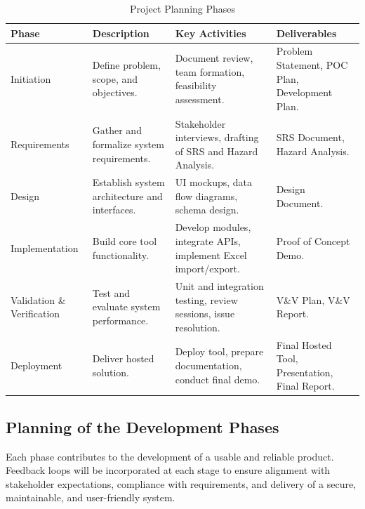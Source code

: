 \documentclass[12pt]{article}
\begin{document}
\begin{table}[H]
\centering
\caption{Project Planning Phases}
\setlength{\tabcolsep}{4pt}
\renewcommand{\arraystretch}{1.2}
\footnotesize

\begin{tabularx}{\textwidth}{p{2.5cm} Y Y Y}
\toprule
\textbf{Phase} & \textbf{Description} & \textbf{Key Activities} & \textbf{Deliverables} \\
\midrule
{}
Initiation &
Define problem, scope, and objectives. &
Document review, team formation, feasibility assessment. &
Problem Statement, POC Plan, Development Plan. \\
\hline
Requirements &
Gather and formalize system requirements. &
Stakeholder interviews, drafting of SRS and Hazard Analysis. &
SRS Document, Hazard Analysis. \\
\hline
Design &
Establish system architecture and interfaces. &
UI mockups, data flow diagrams, schema design. &
Design Document. \\
\hline
Implementation &
Build core tool functionality. &
Develop modules, integrate APIs, implement Excel import/export. &
Proof of Concept Demo. \\
\hline
Validation \& Verification &
Test and evaluate system performance. &
Unit and integration testing, review sessions, issue resolution. &
V\&V Plan, V\&V Report. \\
\hline
Deployment &
Deliver hosted solution. &
Deploy tool, prepare documentation, conduct final demo. &
Final Hosted Tool, Presentation, Final Report. \\
\bottomrule
\end{tabularx}
\end{table}


\subsection{Planning of the Development Phases}

Each phase contributes to the development of a usable and reliable product. Feedback loops will be incorporated at each stage to ensure alignment with stakeholder expectations, compliance with requirements, and delivery of a secure, maintainable, and user-friendly system.
\end{document}
